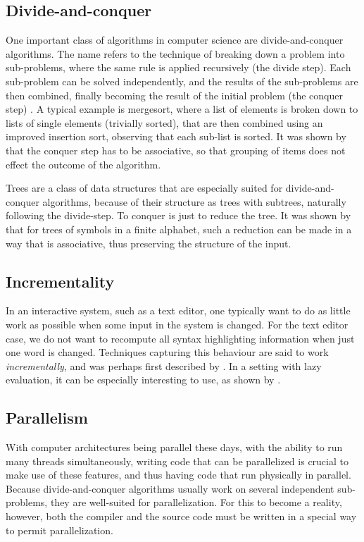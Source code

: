 \documentclass[a4paper,12pt,notitlepage]{report}
\renewcommand\cite{\citep}
\begin{document}
\subsection{Divide-and-conquer}
One important class of algorithms in computer science are divide-and-conquer 
algorithms. The name refers to the technique of breaking down a problem into
sub-problems, where the same rule is applied recursively (the divide step). Each
sub-problem can be solved independently, and the results of the sub-problems are
then combined, finally becoming the result of the initial problem (the conquer
step) \cite[p.209]{algorithmdesign}. A typical example is mergesort, where a
list of elements is broken down to lists of single elements (trivially sorted),
that are then combined using an improved insertion sort, observing that each
sub-list is sorted. It was shown by \citet{birdlists} that the conquer step has
to be associative, so that grouping of items does not effect the outcome of the
algorithm. 

Trees are a class of data structures that are especially suited for 
divide-and-conquer algorithms, because of their structure as trees with
subtrees, naturally following the divide-step. To conquer is just to reduce the
tree. It was shown by \citet{parparsepaper} that for trees of symbols in a
finite alphabet, such a reduction can be made in a way that is associative, thus
preserving the structure of the input. 

\subsection{Incrementality}
In an interactive system, such as a text editor, one typically want to do as
little work as possible when some input in the system is changed. For the text
editor case, we do not want to recompute all syntax highlighting information when
just one word is changed. Techniques capturing this behaviour are said to work
\textit{incrementally}, and was perhaps first described by
\cite{incrementalpaper}. In a setting with lazy evaluation, it can be
especially interesting to use, as shown by \cite{lazyfunctional}.

\subsection{Parallelism}
With computer architectures being parallel these days, with the ability to run
many threads simultaneously, writing code that can be parallelized is crucial to
make use of these features, and thus having code that run physically in
parallel. Because divide-and-conquer algorithms usually work on several
independent sub-problems, they are well-suited for parallelization. For this to
become a reality, however, both the compiler and the source code must be written
in a special way to permit parallelization.
\end{document}
